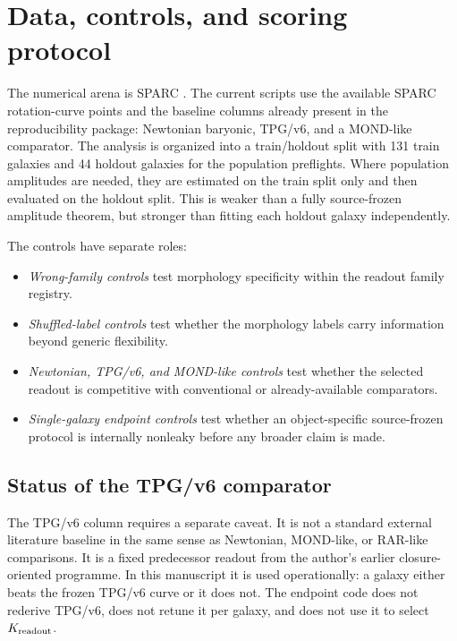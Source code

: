\documentclass[11pt]{article}
\begin{document}
\section{Data, controls, and scoring protocol}

The numerical arena is SPARC \cite{Lelli2016SPARC}.  The current scripts use
the available SPARC rotation-curve points and the baseline columns already
present in the reproducibility package: Newtonian baryonic, TPG/v6, and a
MOND-like comparator.  The analysis is organized into a train/holdout split
with 131 train galaxies and 44 holdout galaxies for the population preflights.
Where population amplitudes are needed, they are estimated on the train split
only and then evaluated on the holdout split.  This is weaker than a fully
source-frozen amplitude theorem, but stronger than fitting each holdout galaxy
independently.

The controls have separate roles:
\begin{itemize}[leftmargin=*]
\item \emph{Wrong-family controls} test morphology specificity within the
readout family registry.
\item \emph{Shuffled-label controls} test whether the morphology labels carry
information beyond generic flexibility.
\item \emph{Newtonian, TPG/v6, and MOND-like controls} test whether the selected
readout is competitive with conventional or already-available comparators.
\item \emph{Single-galaxy endpoint controls} test whether an object-specific
source-frozen protocol is internally nonleaky before any broader claim is made.
\end{itemize}

\subsection{Status of the TPG/v6 comparator}

The TPG/v6 column requires a separate caveat.  It is not a standard external
literature baseline in the same sense as Newtonian, MOND-like, or RAR-like
comparisons.  It is a fixed predecessor readout from the author's earlier
closure-oriented programme.  In this manuscript it is used operationally: a
galaxy either beats the frozen TPG/v6 curve or it does not.  The endpoint code
does not rederive TPG/v6, does not retune it per galaxy, and does not use it to
select \(K_{\rm readout}\).

\noindent{}
\end{document}
